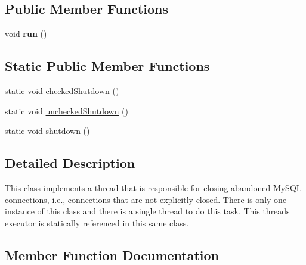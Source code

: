 \subsection*{Public Member Functions}
\begin{DoxyCompactItemize}
\item 
\mbox{\label{classcom_1_1mysql_1_1jdbc_1_1_abandoned_connection_cleanup_thread_aa5088e60ae287742e86745369f560eea}} 
void {\bfseries run} ()
\end{DoxyCompactItemize}
\subsection*{Static Public Member Functions}
\begin{DoxyCompactItemize}
\item 
static void \mbox{\hyperlink{classcom_1_1mysql_1_1jdbc_1_1_abandoned_connection_cleanup_thread_a1f3b87e39a583628bdae7b298b3882c3}{checked\+Shutdown}} ()
\item 
static void \mbox{\hyperlink{classcom_1_1mysql_1_1jdbc_1_1_abandoned_connection_cleanup_thread_abf43aba7ad8fa551a194474046c02235}{unchecked\+Shutdown}} ()
\item 
static void \mbox{\hyperlink{classcom_1_1mysql_1_1jdbc_1_1_abandoned_connection_cleanup_thread_aadfff88a87e766a3c6ad7cc6ced32b89}{shutdown}} ()
\end{DoxyCompactItemize}


\subsection{Detailed Description}
This class implements a thread that is responsible for closing abandoned My\+S\+QL connections, i.\+e., connections that are not explicitly closed. There is only one instance of this class and there is a single thread to do this task. This thread\textquotesingle{}s executor is statically referenced in this same class. 

\subsection{Member Function Documentation}
\mbox{\label{classcom_1_1mysql_1_1jdbc_1_1_abandoned_connection_cleanup_thread_a1f3b87e39a583628bdae7b298b3882c3}} 
